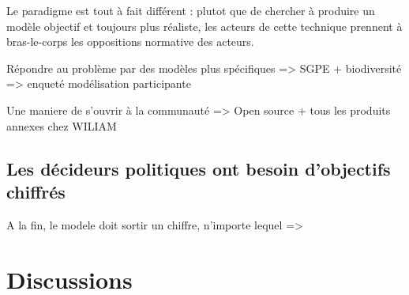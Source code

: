 Le paradigme est tout à fait différent : plutot que de chercher à produire un modèle objectif et toujours plus réaliste, les acteurs de cette technique prennent à bras-le-corps les oppositions normative des acteurs. 

Répondre au problème par des modèles plus spécifiques
=> SGPE + biodiversité
=> enqueté modélisation participante

Une maniere de s'ouvrir à la communauté
=> Open source + tous les produits annexes chez WILIAM

\subsection{Les décideurs politiques ont besoin d'objectifs chiffrés}

A la fin, le modele doit sortir un chiffre, n'importe lequel
=> 


\section{Discussions}








